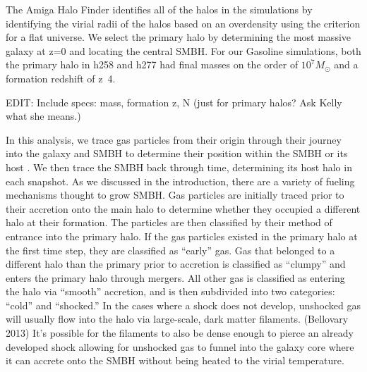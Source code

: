 \documentclass[manuscript]{aastex}
\begin{document}
	
The Amiga Halo Finder identifies all of the halos in the simulations by identifying the virial radii of the halos based on an overdensity using the criterion for a flat universe. \citep{Knebe2001,Knollmann2009,} We select the primary halo by determining the most massive galaxy at z=0 and locating the central SMBH. For our Gasoline simulations, both the primary halo in h258 and h277 had final masses on the order of $10^7 M_{\odot}$ and a formation redshift of z~4.  

EDIT: Include specs: mass, formation z, N (just for primary halos? Ask Kelly what she means.)

In this analysis, we trace gas particles from their origin through their journey into the galaxy and SMBH to determine their position within the SMBH or its host \citep{Brooks2009} . We then trace the SMBH back through time, determining its host halo in each snapshot. As we discussed in the introduction, there are a variety of fueling mechanisms thought to grow SMBH. Gas particles are initially traced prior to their accretion onto the main halo to determine whether they occupied a different halo at their formation. The particles are then classified by their method of entrance into the primary halo. If the gas particles existed in the primary halo at the first time step, they are classified as ``early'' gas. Gas that belonged to a different halo than the primary prior to accretion is classified as ``clumpy'' and enters the primary halo through mergers. All other gas is classified as entering the halo via ``smooth'' accretion, and is then subdivided into two categories: ``cold'' and ``shocked.'' In the cases where a shock does not develop, unshocked gas will usually flow into the halo via large-scale, dark matter filaments. (Bellovary 2013) It's possible for the filaments to also be dense enough to pierce an already developed shock allowing for unshocked gas to funnel into the galaxy core where it can accrete onto the SMBH without being heated to the virial temperature.
	
\end{document}
